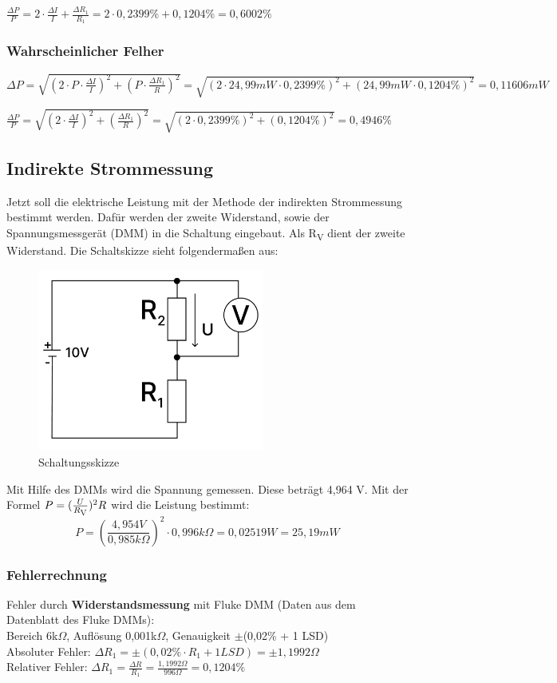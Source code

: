 $\frac{\Delta P}{P} = 2 \cdot \frac{\Delta I}{I} + \frac{\Delta R_1}{R_1} =
2 \cdot 0,2399\% + 0,1204\% = 0,6002\%$

\subsubsection{Wahrscheinlicher Felher}
$ \Delta P = \sqrt{(2 \cdot P \cdot \frac{\Delta I}{I})^2 + (P \cdot \frac{\Delta R_1}{R})^2} =
\sqrt{(2 \cdot 24,99 mW \cdot 0,2399\%)^2 + (24,99 mW \cdot 0,1204\%)^2} = 0,11606mW$

$\frac{\Delta P}{P} = \sqrt{(2 \cdot \frac{\Delta I}{I})^2 + (\frac{\Delta R_1}{R})^2} =
\sqrt{(2 \cdot 0,2399\%)^2 + (0,1204\%)^2} = 0,4946\%$



\subsection{Indirekte Strommessung}
Jetzt soll die elektrische Leistung mit der Methode der indirekten Strommessung
bestimmt werden. Dafür werden der zweite Widerstand, sowie der Spannungsmessgerät
(DMM) in die Schaltung eingebaut. Als R\textsubscript{V} dient der
zweite Widerstand. Die Schaltskizze sieht folgendermaßen aus:

\begin{figure}[H]
	\centering
	\includegraphics[height=6cm]{images/Versuch3/Versuch3_2_Schaltskizze.pdf} 
	\caption{Schaltungsskizze}
	\label{fig: Schaltungsskizze Versuch 3_2}
\end{figure}

Mit Hilfe des DMMs wird die Spannung gemessen. Diese beträgt 4,964 V. Mit der
Formel $P = (\frac{U}{R\textsubscript{V}})^{2}R$ wird die Leistung bestimmt: 
\[P = (\frac{4,954 V}{0,985 k\Omega})^{2}\cdot 0,996k\Omega = 0,02519 W = 25,19 mW\]

\subsubsection{Fehlerrechnung}
Fehler durch \textbf{Widerstandsmessung} mit Fluke DMM (Daten aus dem Datenblatt des Fluke DMMs):\\
Bereich 6k$\Omega$, Auflösung 0,001k$\Omega$, Genauigkeit $\pm$(0,02\% + 1 LSD)\\
Absoluter Fehler: $\Delta R_1 = \pm (0,02\% \cdot R_1 + 1 LSD) = \pm 1,1992 \Omega$\\
Relativer Fehler: $\Delta R_1 = \frac{\Delta R}{R_1} = \frac{1,1992 \Omega}{996 \Omega} = 0,1204\%$\par

